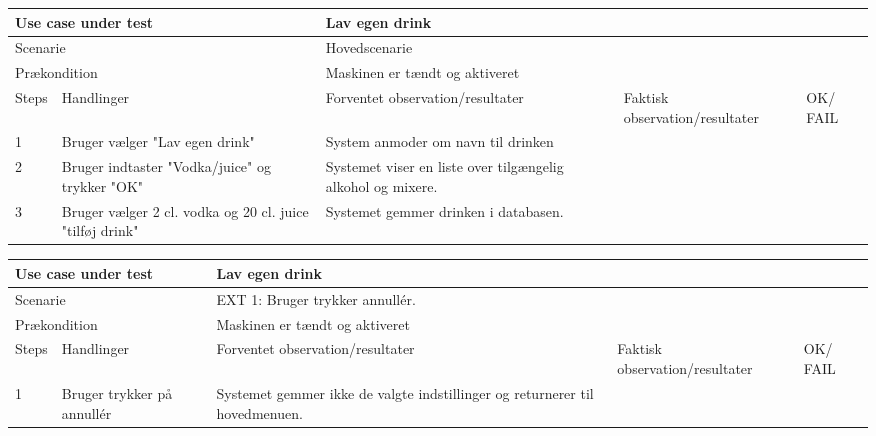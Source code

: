 \begin{table}[H]
\begin{tabular}{|p{1cm}|p{4cm}|p{4cm}|p{4cm}|p{1cm}|}
\hline
\multicolumn{2}{|p{5cm}|}{Use case under test} & \multicolumn{3}{p{9cm}|}{Lav egen drink}                                       \\ \hline
\multicolumn{2}{|p{5cm}|}{Scenarie}            & \multicolumn{3}{p{9cm}|}{Hovedscenarie}                                          \\ \hline
\multicolumn{2}{|p{5cm}|}{Prækondition}        & \multicolumn{3}{p{9cm}|}{Maskinen er tændt og aktiveret}                                 \\ \hline
Steps               & Handlinger          & Forventet observation/resultater & Faktisk observation/resultater & OK/ FAIL \\ \hline
1    & Bruger vælger "Lav egen drink"  & System anmoder om navn til drinken &   &         \\ \hline
2    & Bruger indtaster "Vodka/juice" og trykker "OK"  & Systemet viser en liste over tilgængelig alkohol og mixere.  &   &         \\ \hline
3    & Bruger vælger 2 cl. vodka og 20 cl. juice "tilføj drink"  & Systemet gemmer drinken i databasen.  &   &         \\ \hline

\end{tabular}
\end{table}

\begin{table}[H]
\begin{tabular}{|p{1cm}|p{4cm}|p{4cm}|p{4cm}|p{1cm}|}
\hline
\multicolumn{2}{|p{5cm}|}{Use case under test} & \multicolumn{3}{p{9cm}|}{Lav egen drink}                                       \\ \hline
\multicolumn{2}{|p{5cm}|}{Scenarie}            & \multicolumn{3}{p{9cm}|}{EXT 1: Bruger trykker annullér.}                                          \\ \hline
\multicolumn{2}{|p{5cm}|}{Prækondition}        & \multicolumn{3}{p{9cm}|}{Maskinen er tændt og aktiveret}                                 \\ \hline
Steps               & Handlinger          & Forventet observation/resultater & Faktisk observation/resultater & OK/ FAIL \\ \hline
1    & Bruger trykker på annullér  & Systemet gemmer ikke de valgte indstillinger og returnerer til hovedmenuen. & &         \\ \hline

\end{tabular}
\end{table}

